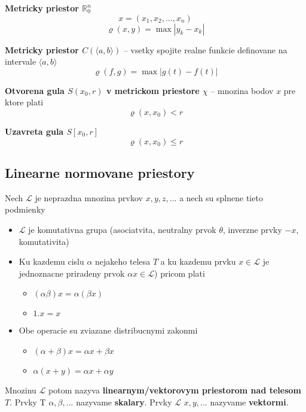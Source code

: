 \documentclass[12pt]{article}
\begin{document}
\textbf{Metricky priestor $\mathbb{R}^{n}_{0}$}
\begin{equation*}
	x = (x_{1},x_{2},...,x_{n})
\end{equation*}
\begin{equation*}
	\varrho(x,y) = \max{|y_{k} - x_{k}|}
\end{equation*}

\textbf{Metricky priestor $C(\langle a,b \rangle)$} -- vsetky spojite realne funkcie definovane na intervale $\langle a,b \rangle$
\begin{equation*}
	\varrho(f,g) = \max{|g(t) - f(t)|}
\end{equation*}

\textbf{Otvorena gula $S(x_{0},r)$ v metrickom priestore $\chi$} -- mnozina bodov $x$ pre ktore plati
\begin{equation*}
	\varrho(x,x_{0}) < r
\end{equation*}

\textbf{Uzavreta gula $S[x_{0}, r]$}
\begin{equation*}
	\varrho(x,x_{0}) \le r
\end{equation*}

\subsection{Linearne normovane priestory}
Nech $\mathcal{L}$ je neprazdna mnozina prvkov $x,y,z,...$ a nech su splnene tieto podmienky
\begin{itemize}
	\item $\mathcal{L}$ je komutativna grupa (asociatvita, neutralny prvok $\theta$, inverzne prvky $-x$, komutativita)
	\item Ku kazdemu cislu $\alpha$ nejakeho telesa $T$ a ku kazdemu prvku $x \in \mathcal{L}$ je jednoznacne priradeny
		prvok $\alpha x \in \mathcal{L}$) pricom plati
		\begin{itemize}
			\item $(\alpha\beta)x = \alpha(\beta x)$
			\item $1.x = x$
		\end{itemize}
	\item Obe operacie su zviazane distribucnymi zakonmi
		\begin{itemize}
			\item $(\alpha + \beta)x = \alpha x + \beta x$
			\item $\alpha(x+y) = \alpha x + \alpha y$
		\end{itemize}
\end{itemize}
Mnozinu $\mathcal{L}$ potom nazyva \textbf{linearnym/vektorovym priestorom nad telesom $T$}. Prvky T $\alpha,\beta,...$ nazyvame
\textbf{skalary}. Prvky $\mathcal{L}$ $x,y,...$ nazyvame \textbf{vektormi}.
\end{document}
